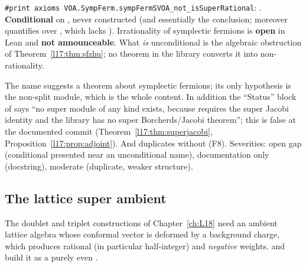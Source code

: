 \begin{status}
\texttt{\#print axioms VOA.SympFerm.sympFermSVOA\_not\_isSuperRational}: . \textbf{Conditional} on ,
never constructed (and essentially the conclusion; moreover  quantifies over
, which lacks ). Irrationality of symplectic fermions is \textbf{open} in Lean and
\textbf{not announceable}. What \emph{is}
unconditional is the algebraic obstruction of Theorem~\ref{l17:thm:sfzhu}; no theorem in the library
converts it into non-rationality.
\end{status}

\begin{warning}[title={Finding (F4): a conditional that assumes its conclusion; stale status block}]
The name  suggests a theorem about symplectic fermions; its
only hypothesis is the non-split module, which is the whole content. In addition the ``Status'' block
of  says ``no super module of any kind exists, because
 requires the super Jacobi identity and the library has no super
Borcherds/Jacobi theorem''; this is false at the documented commit (Theorem~\ref{l17:thm:superjacobi},
Proposition~\ref{l17:prop:adjoint}). And  duplicates
 without  (F8). Severities: open gap (conditional presented near an
unconditional name), documentation only (docstring), moderate (duplicate, weaker structure).
\end{warning}

\subsection{The lattice super ambient}\label{l17:sec:lattice}

The doublet and triplet constructions of Chapter~\ref{ch:L18} need an ambient lattice algebra whose
conformal vector is deformed by a background charge, which produces rational (in particular
half-integer) and \emph{negative} weights.  and
 build it as a purely even .

